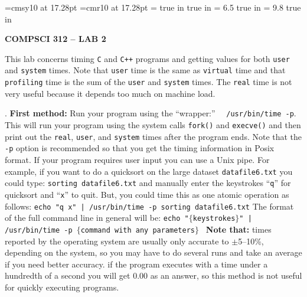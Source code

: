 %
%
\def\scriptA{{\cal A}}   %
\def\boldN{{\bf N}}
\def\boldR{{\bf R}}
\def\boldRP{{\bf R}$^+$}   %
\def\boldC{{\bf C}}
%
\def\eop{\vrule height10pt width6pt depth0pt}
\def\mapleft#1{\ \smash{\mathop{\longleftarrow}\limits^{#1}}\ }
%
%
%
\font\bigcal=cmsy10 at 17.28pt
\font\bigrm=cmr10 at 17.28pt
%
\magnification=   %
\nopagenumbers             %
 true in
 true in
\hsize = 6.5 true in       %
\vsize = 9.8 true in       %
\baselineskip12pt          %
\parskip4pt                %
\null
\centerline{\bf COMPSCI 312 -- LAB 2}
\vskip5pt

\noindent
   This lab concerns timing {\tt C} and {\tt C++} programs
and getting values for both {\tt user} and {\tt system} times.
Note that {\tt user} time is the same as {\tt virtual} time and
that {\tt profiling} time is the sum of the {\tt user} and
{\tt system} times. The  {\tt real} time is not very useful because
it depends too much on machine load.

. {\bf First method:} Run your program using the ``wrapper:'' \ \ 
 {\tt /usr/bin/time -p}. \hfil\break
 This will run your program using the system calls {\tt fork()}
 and {\tt execve()} and then print out the {\tt real}, 
 {\tt user}, and {\tt system} times after the program ends. 
 Note that the {\tt -p} option is recommended so that you
 get the timing information in Posix format. If your program
 requires user input you can use a Unix pipe. For example, if
 you want to do a quicksort on the large dataset {\tt datafile6.txt}
 you could type: \hfil\break
{\tt sorting datafile6.txt} \hfil\break
 and manually enter the keystrokes ``{\tt q}'' for quicksort 
 and ``{\tt x}'' to quit. 
 But, you could time this as one atomic operation as follows: \hfil\break
{\tt echo "q x" | /usr/bin/time -p sorting datafile6.txt} \hfil\break
 The format of the full command line in general will be: \hfil\break
{\tt echo "$\{$keystrokes$\}$" | /usr/bin/time -p $\{$command with
   any parameters$\}$ }\hfil\break
 {\bf Note that:}
 times reported by the operating system are usually
	only accurate to $\pm$5--10\%, depending on the
	system, so you may have to do several runs and take an 
	average if you need better accuracy.
 if the program executes with a time under a hundredth 
	of a second you will get $0.00$ as an answer, so this method is
	not useful for quickly executing programs.

